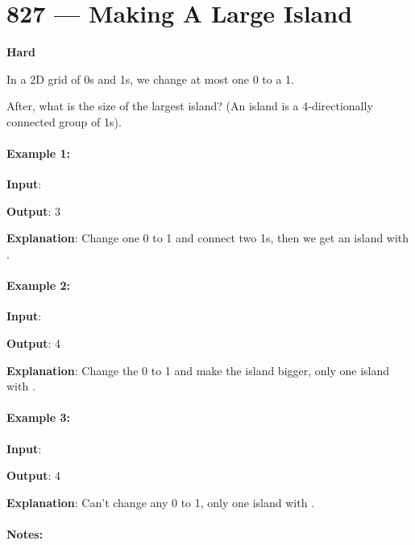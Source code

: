\section{827 --- Making A Large Island}

\textbf{Hard}

In a 2D grid of 0s and 1s, we change at most one 0 to a 1.

After, what is the size of the largest island? (An island is a 4-directionally connected group of 1s).

\paragraph{Example 1:}

\begin{flushleft}
\textbf{Input}: \fcj{[[1, 0], [0, 1]]}

\textbf{Output}: 3

\textbf{Explanation}: Change one 0 to 1 and connect two 1s, then we get an island with .
\end{flushleft}

\paragraph{Example 2:}

\begin{flushleft}
\textbf{Input}: \fcj{[[1, 1], [1, 0]]}

\textbf{Output}: 4

\textbf{Explanation}: Change the 0 to 1 and make the island bigger, only one island with .
\end{flushleft}

\paragraph{Example 3:}

\begin{flushleft}
\textbf{Input}: \fcj{[[1, 1], [1, 1]]}

\textbf{Output}: 4

\textbf{Explanation}: Can't change any 0 to 1, only one island with .
\end{flushleft}

 

\paragraph{Notes:}

